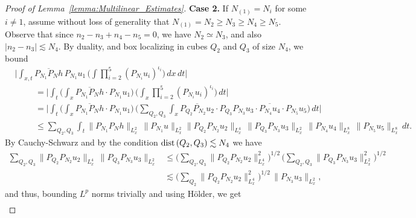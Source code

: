 \documentclass[10pt,a4paper]{amsart}
\newcommand{\dist} {\text{dist\! }}
\begin{document}
\begin{proof}[Proof of Lemma~\ref{lemma:Multilinear_Estimates}]
\textbf{Case 2. }
If $N_{(1)} = N_i$ for some $i \neq 1$, 
    assume without loss of generality that $N_{(1)} = N_2 \geq N_3 \geq N_4 \geq N_5$. 
    Observe that since $n_2 - n_3 + n_4 - n_5 = 0$, we have $N_2 \simeq N_3$, 
    and also $|n_2 - n_3| \lesssim N_4$. 
    By duality, and box localizing in cubes $Q_2$ and $Q_3$ of size $N_4$, 
    we bound
    \begin{align}\label{eq:N_2Largest}
        & \Big|\int_{x,t} \overline{P_{N_1}P_N h} \,  P_{N_1} u_1 \, \bigg(\int \prod_{i=2}^5 (P_{N_i} u_i)^{\iota_i} \bigg) \, dx\, dt \Big| \nonumber \\
        & \hspace{1cm} = 
        \Big|\int_t \bigg( \int_x \overline{P_{N_1}P_N h} \cdot  P_{N_1} u_1 \bigg)\, \bigg(\int_x \prod_{i=2}^5 (P_{N_i} u_i)^{\iota_i} \bigg) \, dt \Big|   \\
        & \hspace{1cm} = 
        \Big| \int_t \bigg( \int_x \overline{P_{N_1}P_N h} \cdot  P_{N_1} u_1 \bigg)\, \bigg( \sum_{Q_2, Q_3}\int_x \overline{P_{Q_2}P_{N_2} u_2} \cdot P_{Q_3}P_{N_3} u_3  \cdot \overline{P_{N_4} u_4} \cdot P_{N_5} u_5\bigg) \, dt \Big|  \nonumber \\
        & \hspace{1cm} \leq 
        \sum_{Q_2, Q_3}
        \int_t \lVert P_{N_1}P_N h \rVert_{L_x^2}  \, \lVert P_{N_1} u \rVert_{L_x^2}  
        \lVert P_{Q_2} P_{N_2} u_2 \rVert_{L_x^4} \, 
        \lVert P_{Q_3}P_{N_3} u_3 \rVert_{L_x^2} \, 
        \lVert P_{N_4} u_4 \rVert_{L_x^8} \, 
        \lVert P_{N_5} u_5 \rVert_{L_x^8} \, dt. \nonumber
    \end{align}
    By Cauchy-Schwarz and by the condition $\dist(Q_2, Q_3) \lesssim N_4$ we have
    \begin{align}
        \sum_{Q_2, Q_3}
        \lVert P_{Q_2} P_{N_2} u_2 \rVert_{L_x^4} \, 
        \lVert P_{Q_3}P_{N_3} u_3 \rVert_{L_x^2} 
        & \leq 
        \Big( \sum_{Q_2, Q_3}
        \lVert P_{Q_2} P_{N_2} u_2 \rVert_{L_x^4}^2 \Big)^{1/2} \, 
        \Big( \sum_{Q_2, Q_3}
        \lVert P_{Q_3}P_{N_3} u_3 \rVert_{L_x^2}^2 \Big)^{1/2} \\
        & \lesssim 
        \Big( \sum_{Q_2}
        \lVert P_{Q_2} P_{N_2} u_2 \rVert_{L_x^4}^2 \Big)^{1/2} \, 
        \lVert P_{N_3} u_3 \rVert_{L_x^2},
    \end{align}
    and thus, bounding $L^p$ norms trivially and using H\"older, we get
    \begin{align}\label{eq:Multilinear_Almost_Last_Step}

\end{align}
\end{proof}
\end{document}
